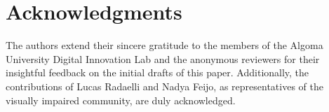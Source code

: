 \documentclass[conference]{IEEEtran}
\begin{document}
\section{Acknowledgments}\label{ai-disclosure}
The authors extend their sincere gratitude to the members of the Algoma University Digital Innovation Lab and the anonymous reviewers for their insightful feedback on the initial drafts of this paper. Additionally, the contributions of Lucas Radaelli and Nadya Feijo, as representatives of the visually impaired community, are duly acknowledged.



\end{document}
